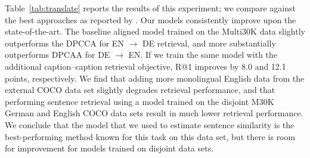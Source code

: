 Table~\ref{tab:translate} reports the results of this experiment; we compare against the best approaches as reported by . Our models consistently improve upon the state-of-the-art. The baseline aligned model trained on the Multi30K data slightly outperforms the DPCCA for EN $\rightarrow$ DE retrieval, and more substantially outperforms DPCAA for DE $\rightarrow$ EN. If we train the same model with the additional caption--caption retrieval objective, R@1 improves by 8.0 and 12.1 points, respectively. We find that adding more monolingual English data from the external COCO data set slightly degrades retrieval performance, and that performing sentence retrieval using a model trained on the disjoint M30K German and English COCO data sets result in much lower retrieval performance. We conclude that the model that we used to estimate sentence similarity is the best-performing method known for this task on this data set, but there is room for improvement for models trained on disjoint data sets.

